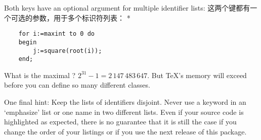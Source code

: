 \begin{paracol}{2}
 Both keys have an optional  argument for multiple
 identifier lists:
 \switchcolumn
 这两个键都有一个可选的参数，用于多个标识符列表：
\switchcolumn[0]*%
\ifcolor
 \begin{lstxsample}
 \end{lstxsample}
\else
 \begin{lstxsample}
 \end{lstxsample}
\fi
 \begin{lstsample}{}{}
    \begin{lstlisting}
    for i:=maxint to 0 do
    begin
        j:=square(root(i));
    end;
    \end{lstlisting}
 \end{lstsample}
 \begin{advise}
 \item What is the maximal ?
       \advisespace
       $2^{31}-1=2\,147\,483\,647$. But \TeX's memory will exceed before you
       can define so many different classes.
 \end{advise}

 One final hint: Keep the lists of identifiers disjoint. Never use a keyword
 in an `emphasize' list or one name in two different lists. Even if your
 source code is highlighted as expected, there is no guarantee that it is
 still the case if you change the order of your listings or if you use the
 next release of this package.



\end{paracol}